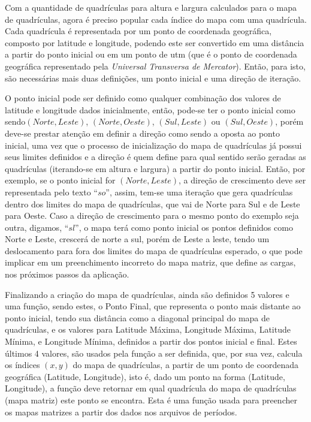 Com a quantidade de quadrículas para altura e largura calculados para o mapa de quadrículas, agora é preciso popular cada índice do mapa com uma quadrícula. Cada quadrícula é representada por um ponto de coordenada geográfica, composto por latitude e longitude, podendo este ser convertido em uma distância a partir do ponto inicial ou em um ponto de utm (que é o ponto de coordenada geográfica representado pela \emph{Universal Transversa de Mercator}). Então, para isto, são necessárias mais duas definições, um ponto inicial e uma direção de iteração. 

O ponto inicial pode ser definido como qualquer combinação dos valores de latitude e longitude dados inicialmente, então, pode-se ter o ponto inicial como sendo\( (Norte, Leste)\), \((Norte, Oeste)\), \((Sul, Leste)\) ou \((Sul, Oeste)\), porém deve-se prestar atenção em definir a direção como sendo a oposta ao ponto inicial, uma vez que o processo de inicialização do mapa de quadrículas já possui seus limites definidos e a direção é quem define para qual sentido serão geradas as quadrículas (iterando-se em altura e largura) a partir do ponto inicial. Então, por exemplo, se o ponto inicial for \((Norte, Leste)\), a direção de crescimento deve ser representada pelo texto \(“so”\), assim, tem-se uma iteração que gera quadrículas dentro dos limites do mapa de quadrículas, que vai de Norte para Sul e de Leste para Oeste. Caso a direção de crescimento para o mesmo ponto do exemplo seja outra, digamos, \(“sl”\), o mapa terá como ponto inicial os pontos definidos como Norte e Leste, crescerá de norte a sul, porém de Leste a leste, tendo um deslocamento para fora dos limites do mapa de quadrículas esperado, o que pode implicar em um preenchimento incorreto do mapa matriz, que define as cargas, nos próximos passos da aplicação.
	
Finalizando a criação do mapa de quadrículas, ainda são definidos 5 valores e uma função, sendo estes, o Ponto Final, que representa o ponto mais distante ao ponto inicial, tendo sua distância como a diagonal principal do mapa de quadrículas, e os valores para Latitude Máxima, Longitude Máxima, Latitude Mínima, e Longitude Mínima, definidos a partir dos pontos inicial e final. Estes últimos 4 valores, são usados pela função a ser definida, que, por sua vez, calcula os índices \((x,y)\) do mapa de quadrículas, a partir de um ponto de coordenada geográfica (Latitude, Longitude), isto é, dado um ponto na forma (Latitude, Longitude), a função deve retornar em qual quadrícula do mapa de quadrículas (mapa matriz) este ponto se encontra. Esta é uma função usada para preencher os mapas matrizes a partir dos dados nos arquivos de períodos.

